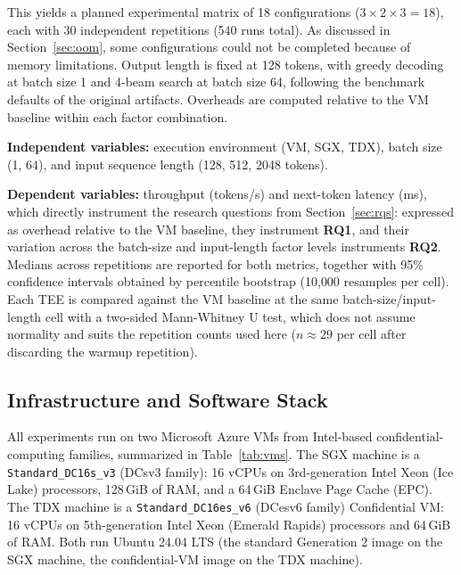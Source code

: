 \documentclass[sigconf]{acmart}
\begin{document}
This yields a planned experimental matrix of 18 configurations ($3 \times 2 \times 3 = 18$),
each with 30 independent repetitions (540 runs total). As discussed in
Section~\ref{sec:oom}, some configurations could not be completed because of memory
limitations. Output length is fixed at 128 tokens, with greedy decoding at batch size 1
and 4-beam search at batch size 64, following the benchmark defaults of the original
artifacts. Overheads are computed relative to the VM baseline within each factor
combination.

\textbf{Independent variables:} execution environment (VM, SGX, TDX), batch size (1, 64),
and input sequence length (128, 512, 2048 tokens).

\textbf{Dependent variables:} throughput (tokens/s) and next-token latency (ms), which
directly instrument the research questions from Section~\ref{sec:rqs}: expressed as
overhead relative to the VM baseline, they instrument \textbf{RQ1}, and their variation
across the batch-size and input-length factor levels instruments \textbf{RQ2}. Medians
across repetitions are reported for both metrics, together with 95\% confidence
intervals obtained by percentile bootstrap (10{,}000 resamples per cell). Each TEE is
compared against the VM baseline at the same batch-size/input-length cell with a
two-sided Mann-Whitney U test, which does not assume normality and suits the
repetition counts used here ($n \approx 29$ per cell after discarding the warmup
repetition).

\subsection{Infrastructure and Software Stack}

All experiments run on two Microsoft Azure VMs from Intel-based confidential-computing
families, summarized in Table~\ref{tab:vms}. The SGX machine is a
\texttt{Standard\_DC16s\_v3} (DCsv3 family): 16 vCPUs on 3rd-generation Intel Xeon
(Ice Lake) processors, 128\,GiB of RAM, and a 64\,GiB Enclave Page Cache (EPC). The TDX
machine is a \texttt{Standard\_DC16es\_v6} (DCesv6 family) Confidential VM: 16 vCPUs on
5th-generation Intel Xeon (Emerald Rapids) processors and 64\,GiB of RAM. Both run
Ubuntu 24.04 LTS (the standard Generation 2 image on the SGX machine, the
confidential-VM image on the TDX machine).
\end{document}
